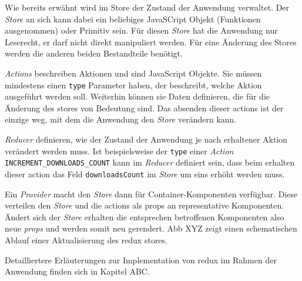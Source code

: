 
Wie bereits erwähnt wird im Store der Zustand der Anwendung verwaltet. Der \textit{Store} an sich kann dabei ein beliebiges JavaSCript Objekt (Funktionen ausgenommen) oder Primitiv sein. Für diesen \textit{Store} hat die Anwendung nur Leserecht, er darf nicht direkt manipuliert werden. Für eine Änderung des Stores werden die anderen beiden Bestandteile benötigt.

\textit{Actions} beschreiben Aktionen und sind JavaScript Objekte. Sie müssen mindestens einen \verb|type| Parameter haben, der beschreibt, welche Aktion ausgeführt werden soll. Weiterhin können sie Daten definieren, die für die Änderung des stores von Bedeutung sind. Das absenden dieser actions ist der einzige weg, mit dem die Anwendung den \textit{Store} verändern kann.

\textit{Reducer} definieren, wie der Zustand der Anwendung je nach erhaltener Aktion verändert werden muss. Ist beispielsweise der \verb|type| einer \textit{Action} \verb|INCREMENT_DOWNLOADS_COUNT| kann im \textit{Reducer} definiert sein, dass beim erhalten dieser action das Feld \verb|downloadsCount| im \textit{Store} um eins erhöht werden muss.

Ein \textit{Provider} macht den \textit{Store} dann für Container-Komponenten verfügbar. Diese verteilen den \textit{Store} und die actions als props an representative Komponenten. Ändert sich der \textit{Store} erhalten die entsprechen betroffenen Komponenten also neue \textit{props} und werden somit neu gerendert.
Abb XYZ zeigt einen schematischen Ablauf einer Aktualisierung des redux stores.

Detailliertere Erläuterungen zur Implementation von redux im Rahmen der Anwendung finden sich in Kapitel ABC.
